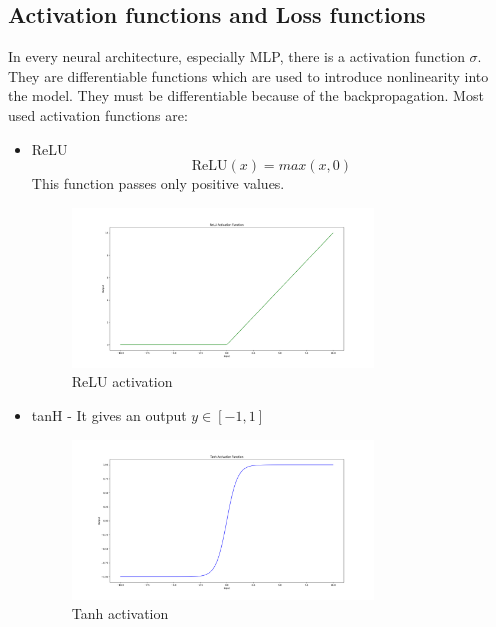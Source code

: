 \subsection{Activation functions and Loss functions}
In every neural architecture, especially MLP, there is a activation function  $\sigma$.
They are differentiable functions which are used to introduce nonlinearity into the model. They must be differentiable because of the backpropagation.
Most used activation functions are:
\begin{itemize}
	\item ReLU\\
	\begin{equation}
		\text{ReLU}(x) = max(x,0)
	\end{equation}
	This function passes only positive values.\\
	\begin{figure}[h!]
		\centering\includegraphics[width=8cm]{chapters/chapter2/relu}
		\caption{ReLU activation}
		\label{relu}
	\end{figure}
	\item tanH - It gives an output $y \in [-1,1]$\\
	\begin{figure}[h!]
		\centering\includegraphics[width=8cm]{chapters/chapter2/tanh}
		\caption{Tanh activation}
		\label{tanh}
	\end{figure}
\end{itemize} 

